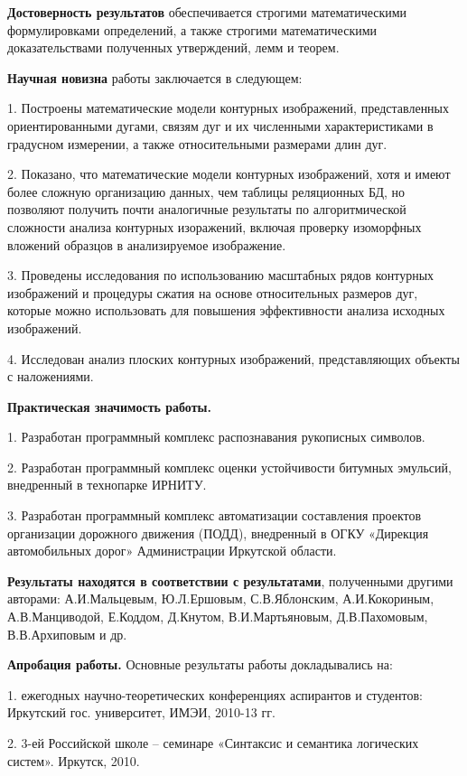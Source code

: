 \textbf{Достоверность результатов} обеспечивается строгими математическими формулировками определений, а также строгими математическими доказательствами полученных утверждений, лемм и теорем.

\textbf{Научная новизна} работы заключается в следующем: 

1. Построены математические модели контурных изображений, представленных ориентированными дугами, связям дуг и их численными характеристиками в градусном измерении,  а также  относительными размерами  длин дуг.  

2. Показано, что математические модели контурных изображений, хотя и имеют более сложную организацию данных, чем  таблицы реляционных БД, но позволяют получить почти аналогичные результаты по алгоритмической сложности  анализа контурных изоражений, включая проверку изоморфных вложений образцов в анализируемое изображение.

3. Проведены исследования по использованию масштабных рядов контурных изображений и процедуры сжатия на  основе относительных размеров дуг, которые можно использовать для повышения эффективности анализа исходных изображений.

4. Исследован анализ плоских контурных изображений, представляющих объекты с наложениями.


\noindent
\textbf{Практическая значимость работы.}

1.  Разработан  программный комплекс распознавания рукописных символов.

2.  Разработан  программный комплекс оценки устойчивости битумных эмульсий, внедренный в технопарке  ИРНИТУ.

3.  Разработан  программный комплекс автоматизации составления проектов организации дорожного движения (ПОДД), внедренный в ОГКУ «Дирекция автомобильных дорог» Администрации Иркутской области.

\textbf{Результаты находятся в соответствии с результатами}, полученными другими авторами: А.И.Мальцевым,  Ю.Л.Ершовым, С.В.Яблонским,  А.И.Кокориным, А.В.Манциводой,  Е.Коддом, Д.Кнутом, В.И.Мартьяновым, Д.В.Пахомовым, В.В.Архиповым и др.

\textbf{Апробация работы.} Основные результаты работы докладывались на: 


1. ежегодных научно-теоретических конференциях аспирантов и студентов:  Иркутский  гос. университет, ИМЭИ, 2010-13 гг.

2. 3-ей Российской школе – семинаре «Синтаксис и семантика логических систем». Иркутск, 2010.

